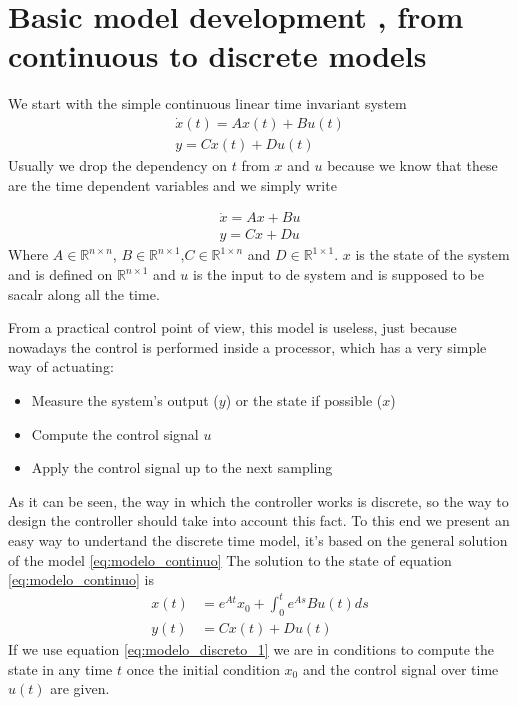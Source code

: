 \documentclass[nols]{tufte-handout}
\theoremstyle{definition}
\begin{document}
\section{Basic model development , from continuous to discrete models}

We start with the simple continuous linear time invariant system
\begin{align}
    \dot x(t)=Ax(t)+Bu(t)\nonumber\\
    y=Cx(t)+Du(t)
\end{align}
Usually we drop the dependency on $t$ from $x$ and $u$ because we know that these are the time dependent variables and we simply write

\begin{align}
    \dot x=Ax+Bu\nonumber\\
    y=Cx+Du\label{eq:modelo_continuo}
\end{align}
Where $A\in\mathbb{R}^{n\times n}$, $B\in\mathbb{R}^{n\times 1}$,$C \in \mathbb{R}^{1\times n}$ and $D\in \mathbb{R}^{1 \times 1}$. $x$ is the state of the system and is defined on $\mathbb{R}^{n\times 1}$ and $u$ is the input to de system and is supposed to be sacalr along all the time.

From a practical control point of view, this model is useless, just because nowadays the control is performed inside a processor, which has a very simple way of actuating:
\begin{itemize}
    \item Measure the system's output ($y$) or the state if possible ($x$)
    \item Compute the control signal $u$
    \item Apply the control signal up to the next sampling
\end{itemize}

As it can be seen, the way in which the controller works is discrete, so the way to design the controller should take into account this fact.
To this end we present an easy  way to undertand the discrete time model, it's based on the general solution of the model \ref{eq:modelo_continuo}  
The solution to the state of equation \ref{eq:modelo_continuo} is 
\begin{align}
    x(t)&=e^{At}x_0+\int_0^t e^{As}Bu(t)ds\nonumber\\
    y(t)&=Cx(t)+Du(t)\label{eq:modelo_discreto_1}
\end{align}
If we use equation \ref{eq:modelo_discreto_1} we are in conditions to compute the state in any time $t$ once the initial condition $x_0$ and the control signal over time $u(t)$ are given. 
\end{document}
